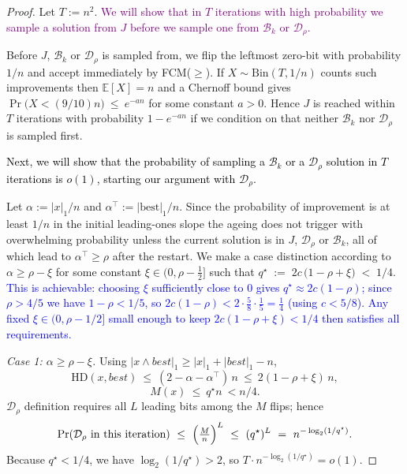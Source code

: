 \begin{proof}
	Let $T:=n^2$. \textcolor{purple}{We will show that in $T$ iterations with high probability we sample a solution from  $J$ before we sample one from $\mathcal{B}_k$ or $\mathcal{D}_\rho$.}
	
	Before $J$, $\mathcal{B}_k$ or $\mathcal{D}_\rho$ is sampled from, we flip the leftmost zero-bit with probability $1/n$ and accept
	immediately by FCM($\ge$).  If $X\sim\mathrm{Bin}(T,1/n)$ counts such improvements then
	$\mathbb{E}[X]=n$ and a Chernoff bound gives
	$
	\Pr\bigl(X<(9/10)n\bigr)\ \le\ e^{-a n}
	$
	for some constant $a>0$. Hence $J$ is reached within $T$ iterations with probability $1-e^{-a n}$ if we condition on that neither $\mathcal{B}_k$ nor $\mathcal{D}_\rho$ is sampled first.
	
	\textcolor{black}{
		Next, we will show that the probability of sampling a $\mathcal{B}_k$ or a $\mathcal{D}_\rho$ solution in $T$ iterations is $o(1)$, starting our argument with $\mathcal{D}_\rho$. 
		}
	
	Let $\alpha:=|x|_1/n$ and $\alpha^\top:=|\text{best}|_1/n$. Since the probability of improvement is at least $1/n$ in the initial leading-ones slope the ageing does not trigger with overwhelming probability unless the current solution is in $J$, $\mathcal{D}_\rho$ or $\mathcal{B}_k$, all of which lead to $\alpha^\top\ge\rho$ after the restart. We make a case distinction according to $\alpha\ge \rho-\xi$ for some constant $\xi\in(0,\rho-\tfrac12]$  such that	$q^\star \;:=\; 2c\,\bigl(1-\rho+\xi\bigr) \;<\; 1/4$.
\textcolor{blue}{This is achievable: choosing $\xi$ sufficiently close to $0$ gives
$q^\star \approx 2c(1-\rho)$; since $\rho > 4/5$ we have $1-\rho < 1/5$,
so $2c(1-\rho) < 2 \cdot \tfrac{5}{8} \cdot \tfrac{1}{5} = \tfrac{1}{4}$
(using $c < 5/8$).  Any fixed $\xi \in (0, \rho - 1/2]$ small enough to
keep $2c(1-\rho+\xi) < 1/4$ then satisfies all requirements.}
	
	\emph{Case 1: $\alpha\ge \rho-\xi$.}
	Using $|x\wedge best|_1\ge |x|_1+|best|_1-n$,
	\[
	\mathrm{HD}(x,best)\ \le\ (2-\alpha-\alpha^\top)\,n\ \le\ 2(1-\rho+\xi)\,n,
	\]
	\[
	M(x)\ \le\ q^\star n\ <n/4
	.
	\]
	$\mathcal{D}_\rho$ definition requires all $L$ leading bits among the $M$ flips; hence
	\[
	\Pr(\text{$\mathcal{D}_\rho$ in this iteration})
	\ \le\
	\Bigl(\tfrac{M}{n}\Bigr)^{L}
	\ \le\
	(q^\star)^{L}
	\ =\
	n^{-\log_{2}(1/q^\star)}.
	\]
	Because $q^\star<1/4$, we have $\log_{2}(1/q^\star)>2$, so $T\cdot n^{-\log_{2}(1/q^\star)}=o(1)$.
	

\end{proof}
